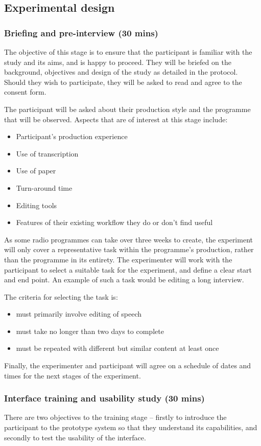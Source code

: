 \subsection{Experimental design}
\subsubsection{Briefing and pre-interview (30 mins)}
The objective of this stage is to ensure that the participant is familiar with
the study and its aims, and is happy to proceed. They will be briefed on the
background, objectives and design of the study as detailed in the protocol.
Should they wish to participate, they will be asked to read and agree to the
consent form.

The participant will be asked about their production style and the programme
that will be observed. Aspects that are of interest at this stage include:
\begin{itemize}
\item Participant's production experience
\item Use of transcription
\item Use of paper
\item Turn-around time
\item Editing tools
\item Features of their existing workflow they do or don't find useful
\end{itemize}

As some radio programmes can take over three weeks to create, the experiment
will only cover a representative task within the programme's production, rather
than the programme in its entirety. The experimenter will work with the
participant to select a suitable task for the experiment, and define a clear
start and end point. An example of such a task would be editing a long
interview.

The criteria for selecting the task is:
\begin{itemize}
\item must primarily involve editing of speech
\item must take no longer than two days to complete
\item must be repeated with different but similar content at least once
\end{itemize}

Finally, the experimenter and participant will agree on a schedule of dates and
times for the next stages of the experiment.

\subsubsection{Interface training and usability study (30 mins)}
There are two objectives to the training stage – firstly to introduce the
participant to the prototype system so that they understand its capabilities,
and secondly to test the usability of the interface.

